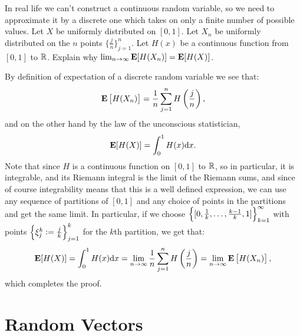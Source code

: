 \documentclass[11pt,a4paper]{article}
\begin{document}
\begin{exercise}
  In real life we can't construct a continuous random variable, so we need
  to approximate it by a discrete one which takes on only a finite number
  of possible values.
  Let $X$ be uniformly distributed on $[0,1]$.
  Let $X_n$ be uniformly distributed on the $n$ points
  $\{\frac{j}{n}\}_{j=1}^{n}$.
  Let $H(x)$ be a continuous function from $[0,1]$ to $\mathbb{R}$.
  Explain why $\lim_{n \to \infty} \mathbf{E}[H(X_n)] = \mathbf{E}[H(X)]$.
\end{exercise}
\begin{solution}
  By definition of expectation of a discrete random variable we see that:
  \[
    \E\left[H(X_n)\right] = \frac{1}{n} \sum_{j=1}^{n} H\del{\frac{j}{n}},
  \]
  and on the other hand by the law of the unconscious statistician,
  \[
    \E[H(X)] =
    \int_{0}^{1} H(x) \dx.
  \]
  Note that since $H$ is a continuous function on $[0,1]$ to $\mathbb{R}$,
  so in particular, it is integrable,
  and its Riemann integral is the limit of the Riemann sums,
  and since of course integrability means that this is a well defined expression,
  we can use any sequence of partitions of $[0,1]$ and any choice of
  points in the partitions and get the same limit.
  In particular,
  if we choose $\left\{[0,\frac{1}{k},\dots,\frac{k-1}{k},1]\right\}_{k=1}^{\infty}$
  with points $\left\{\xi^k_j := \frac{j}{k}\right\}_{j=1}^{k}$ for the $k$th partition,
  we get that:
  \[
    \E[H(X)] =
    \int_{0}^{1} H(x) \dx =
    \lim_{n \to \infty} \frac{1}{n} \sum_{j=1}^{n} H\del{\frac{j}{n}} =
    \lim_{n \to \infty} \E\left[H(X_n)\right],
  \]
  which completes the proof.
\end{solution}

\newpage

\section{Random Vectors}
\end{document}
